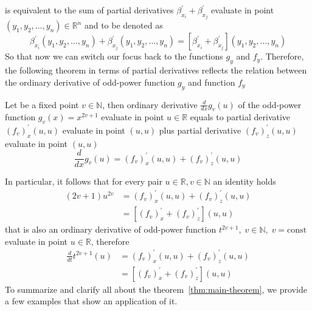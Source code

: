 is equivalent to the sum of partial derivatives $\beta^{'}_{x_i} + \beta^{'}_{x_j}$
evaluate in point $(y_1, y_2, \dots, y_n) \in \mathbb{R}^n$ and to be denoted as
\begin{equation*}
    \beta^{'}_{x_i} (y_1, y_2, \dots, y_n)
    + \beta^{'}_{x_j} (y_1, y_2, \dots, y_n)
    = [\beta^{'}_{x_i} + \beta^{'}_{x_j}] (y_1, y_2, \dots, y_n)
\end{equation*}
So that now we can switch our focus back to the functions $g_{y}$ and $f_{y}$.
Therefore, the following theorem in terms of partial derivatives
reflects the relation between the ordinary derivative of odd-power
function $g_{y}$ and function $f_{y}$
\begin{thm}
    \label{thm:main-theorem}
    Let be a fixed point $v\in \mathbb{N}$, then ordinary derivative $\frac{d}{dx} g_v (u)$ of the odd-power function $g_v(x) = x^{2v + 1}$
    evaluate in point $u\in\mathbb{R}$ equals to partial derivative $(f_{v})^{'}_{x} (u, u)$ evaluate in point $(u, u)$ plus
    partial derivative $(f_{v})^{'}_{z} (u, u)$ evaluate in point $(u, u)$
    \begin{equation}
        \frac{d}{dx} g_v (u) = (f_{v})^{'}_{x} (u, u) + (f_{v})^{'}_{z} (u, u)
        \label{eq:odd-exponential-identity}
    \end{equation}
\end{thm}
In particular, it follows that for every pair $u \in \mathbb{R}, v \in \mathbb{N}$ an identity holds
\begin{align*}
(2v+1)
    u^{2v} &= (f_{v})^{'}_{x} (u, u) + (f_{v})^{'}_{z} (u, u) \\
    &= [(f_{v})^{'}_{x} + (f_{v})^{'}_{z}](u,u)
\end{align*}
that is also an ordinary derivative of odd-power function $t^{2v+1}, \; v\in \mathbb{N}, \; v=\mathrm{const}$
evaluate in point $u\in\mathbb{R}$,
therefore
\begin{align*}
    \frac{d}{dt} t^{2v+1} (u) &= (f_{v})^{'}_{x} (u, u) + (f_{v})^{'}_{z} (u, u) \\
    &= [(f_{v})^{'}_{x} + (f_{v})^{'}_{z}](u,u)
\end{align*}
To summarize and clarify all about the theorem~\ref{thm:main-theorem}, we provide a few examples that show
an application of it.
